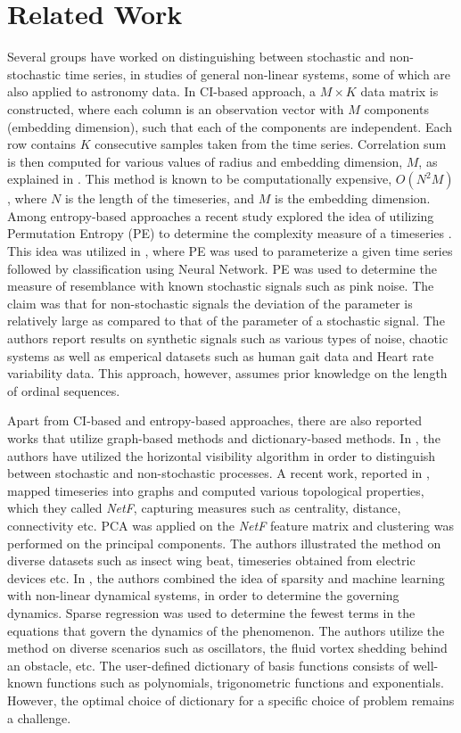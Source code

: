 \documentclass[journal]{IEEEtran}
\begin{document}
	\section{Related Work}
	Several groups have worked on distinguishing between stochastic and non-stochastic time series, in  studies of general non-linear systems, some of which are also applied to astronomy data. In CI-based approach, a $M \times K$ data matrix is constructed, where each column is an observation vector with $M$ components (embedding dimension), such that each of the components are independent. Each row contains $K$  consecutive samples taken from the time series. Correlation sum is then computed for various values of radius and embedding dimension, $M$, as explained in \cite{CIGRacia}. This method is known to be computationally expensive, $O(N^2M)$, where $N$ is the length of the timeseries, and $M$ is the embedding dimension.  Among entropy-based approaches a recent study explored the idea of utilizing Permutation Entropy (PE) to determine the complexity measure of a timeseries \cite{Bandt2002}. This idea was utilized in \cite{Boaretto2021}, where PE was used to parameterize a given time series  followed by classification using  Neural Network. PE was used to determine the measure of resemblance with known stochastic signals such as pink noise. The claim was that for non-stochastic signals the deviation of the parameter is relatively large as compared to that of the parameter of a stochastic signal. The authors report results on synthetic signals such as various types of noise, chaotic systems as well as emperical datasets such as human gait data and Heart rate variability data. This approach, however, assumes prior knowledge on the length of ordinal sequences.

	Apart from CI-based and entropy-based approaches, there are also reported works that utilize graph-based methods and dictionary-based methods. In \cite{lacasa2010}, the authors have utilized the horizontal visibility algorithm in order to distinguish between stochastic and non-stochastic processes. A recent work, reported in \cite{Silva2022}, mapped timeseries into  graphs and computed various topological properties, which they called \textit{NetF}, capturing  measures such as centrality, distance, connectivity etc. PCA was applied on the \textit{NetF} feature matrix and clustering was performed on the principal components. The authors illustrated the method on diverse datasets such as insect wing beat, timeseries obtained from electric devices etc. In \cite{Brunton2016}, the authors combined the idea of sparsity and machine learning with non-linear dynamical systems, in order to determine the governing dynamics. Sparse regression was used to determine the fewest terms in the equations that govern the dynamics of the phenomenon. The authors utilize the method on diverse scenarios such as oscillators, the fluid vortex shedding behind an obstacle, etc. The user-defined dictionary of basis functions consists of well-known functions such as polynomials, trigonometric functions and exponentials. However, the optimal choice of dictionary for a specific choice of problem remains a challenge.
	
\end{document}

